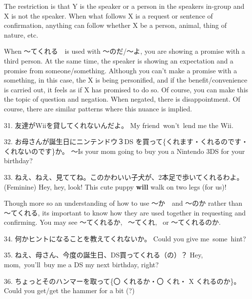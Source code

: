 \par{ The restriction is that Y is the speaker or a person in the speaker\textquotesingle s in-group and X is not the speaker. When what follows X is a request or sentence of confirmation, anything can follow whether X be a person, animal, thing of nature, etc. }
 
\par{ When ～てくれる　is used with ～のだ\slash ～よ, you are showing a promise with a third person. At the same time, the speaker is showing an expectation and a promise from someone\slash something. Although you can't make a promise with a something, in this case, the X is being personified, and if the benefit\slash convenience is carried out, it feels as if X has promised to do so. Of course, you can make this the topic of question and negation. When negated, there is disappointment. Of course, there are similar patterns where this nuance is implied. }
 
\par{31. 友達がWiiを貸してくれないんだよ。 \hfill\break
My friend won't lend me the Wii. }
 
\par{32. お母さんが誕生日にニンテンドウ３DS を買って\{くれます・くれるのです・くれないのです\}か。 \hfill\break
～Is your mom going to buy you a Nintendo 3DS for your birthday? }
 
\par{33. ねえ、ねえ、見ててね。このかわいい子犬が、2本足で歩いてくれるわよ。(Feminine) \hfill\break
Hey, hey, look! This cute puppy \textbf{will }walk on two legs (for us)! }
 
\par{ Though more so an understanding of how to use ～か　and ～のか rather than ～てくれる, it\textquotesingle s important to know how they are used together in requesting and confirming. You may see ～てくれるか,  ～てくれ,  or ～てくれるのか. }
 
\par{34. 何かヒントになることを教えてくれないか。 \hfill\break
Could you give me some hint? }
 
\par{35. ねえ、母さん、今度の誕生日、DS買ってくれる（の）？ \hfill\break
Hey, mom, you'll buy me a DS my next birthday, right? }
 
\par{36. ちょっとそのハンマーを取って\{〇 くれるか・〇 くれ・ X くれるのか\}。 \hfill\break
Could you get\slash get the hammer for a bit (?) }
 
